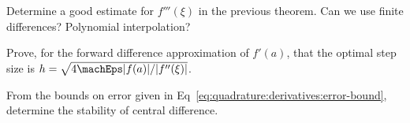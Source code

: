 \begin{xca}
  Determine a good estimate for $f'''(\xi)$ in the previous theorem. Can
  we use finite differences? Polynomial interpolation?
\end{xca}
\begin{xca}
  Prove, for the forward difference approximation of $f'(a)$, that the
  optimal step size is $h = \sqrt{4\machEps |f(a)|/|f''(\xi)|}$.
\end{xca}
\begin{xca}
  From the bounds on error given in Eq~\eqref{eq:quadrature:derivatives:error-bound},
  determine the stability of central difference.
\end{xca}